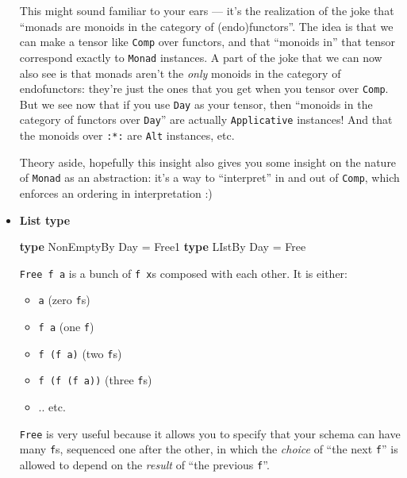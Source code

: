 \documentclass[]{article}
\newenvironment{Shaded}{}{}
\newcommand{\DataTypeTok}[1]{\textcolor[rgb]{0.56,0.13,0.00}{#1}}
\newcommand{\KeywordTok}[1]{\textcolor[rgb]{0.00,0.44,0.13}{\textbf{#1}}}
\newcommand{\OtherTok}[1]{\textcolor[rgb]{0.00,0.44,0.13}{#1}}
\begin{document}
\begin{itemize}
  This might sound familiar to your ears --- it's the realization of the joke
  that ``monads are monoids in the category of (endo)functors''. The idea is
  that we can make a tensor like \texttt{Comp} over functors, and that ``monoids
  in'' that tensor correspond exactly to \texttt{Monad} instances. A part of the
  joke that we can now also see is that monads aren't the \emph{only} monoids in
  the category of endofunctors: they're just the ones that you get when you
  tensor over \texttt{Comp}. But we see now that if you use \texttt{Day} as your
  tensor, then ``monoids in the category of functors over \texttt{Day}'' are
  actually \texttt{Applicative} instances! And that the monoids over
  \texttt{:*:} are \texttt{Alt} instances, etc.

  Theory aside, hopefully this insight also gives you some insight on the nature
  of \texttt{Monad} as an abstraction: it's a way to ``interpret'' in and out of
  \texttt{Comp}, which enforces an ordering in interpretation :)
\item
  \textbf{List type}

\begin{Shaded}
\begin{Highlighting}[]
\KeywordTok{type} \DataTypeTok{NonEmptyBy} \DataTypeTok{Day} \OtherTok{=} \DataTypeTok{Free1}
\KeywordTok{type} \DataTypeTok{LIstBy}     \DataTypeTok{Day} \OtherTok{=} \DataTypeTok{Free}
\end{Highlighting}
\end{Shaded}

  \texttt{Free\ f\ a} is a bunch of \texttt{f\ x}s composed with each other. It
  is either:

  \begin{itemize}
  \tightlist
  \item
    \texttt{a} (zero \texttt{f}s)
  \item
    \texttt{f\ a} (one \texttt{f})
  \item
    \texttt{f\ (f\ a)} (two \texttt{f}s)
  \item
    \texttt{f\ (f\ (f\ a))} (three \texttt{f}s)
  \item
    .. etc.
  \end{itemize}

  \texttt{Free} is very useful because it allows you to specify that your schema
  can have many \texttt{f}s, sequenced one after the other, in which the
  \emph{choice} of ``the next \texttt{f}'' is allowed to depend on the
  \emph{result} of ``the previous \texttt{f}''.


\end{itemize}
\end{document}
